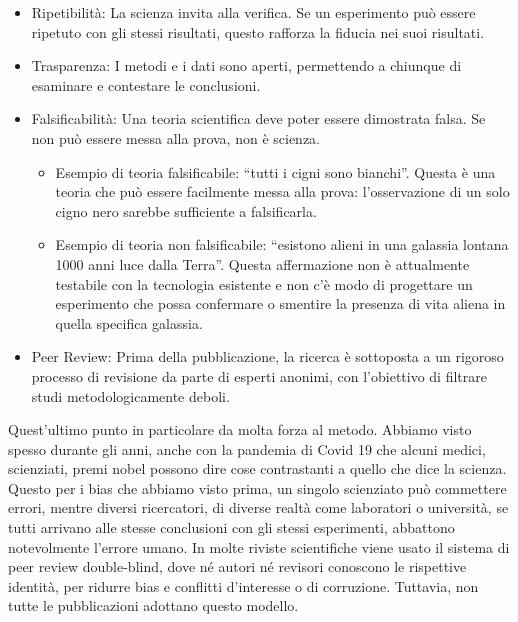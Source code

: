 \documentclass[12pt]{book} %
\begin{document}
\begin{itemize}
\item Ripetibilità: La scienza invita alla verifica. Se un esperimento può essere ripetuto con gli stessi risultati,
questo rafforza la fiducia nei suoi risultati.
\item Trasparenza: I metodi e i dati sono aperti, permettendo a chiunque di esaminare e contestare le conclusioni.
\item Falsificabilità: Una teoria scientifica deve poter essere dimostrata falsa. Se non può essere messa alla prova,
non è scienza. 

\begin{itemize}
\item Esempio di teoria falsificabile: “tutti i cigni sono bianchi”. Questa è una teoria che può essere facilmente messa
alla prova: l'osservazione di un solo cigno nero sarebbe sufficiente a falsificarla.
\item Esempio di teoria non falsificabile: “esistono alieni in una galassia lontana 1000 anni luce dalla Terra”. Questa
affermazione non è attualmente testabile con la tecnologia esistente e non c'è modo di progettare
un esperimento che possa confermare o smentire la presenza di vita aliena in quella specifica galassia.
\end{itemize}
\item Peer Review: Prima della pubblicazione, la ricerca è sottoposta a un rigoroso processo di revisione da parte di
esperti anonimi, con l’obiettivo di filtrare studi metodologicamente deboli.
\end{itemize}
Quest'ultimo punto in particolare da molta forza al metodo. Abbiamo visto spesso durante gli anni,
anche con la pandemia di Covid 19 che alcuni medici, scienziati, premi nobel possono dire cose contrastanti a quello
che dice la scienza. Questo per i bias che abbiamo visto prima, un singolo scienziato può commettere errori, mentre
diversi ricercatori, di diverse realtà come laboratori o università, se tutti arrivano alle stesse conclusioni con gli
stessi esperimenti, abbattono notevolmente l'errore umano. In molte riviste scientifiche viene usato il sistema di peer review double-blind, dove né autori né revisori conoscono le rispettive identità, per ridurre bias e conflitti d’interesse o di corruzione. Tuttavia, non tutte le pubblicazioni adottano questo modello.
\end{document}

